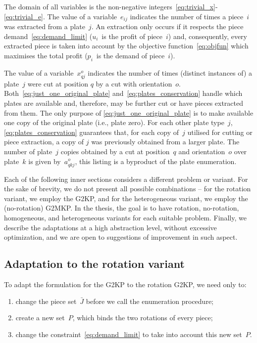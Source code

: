 \documentclass[ppgc,prop-tese,english,formais,babel]{iiufrgs}
\begin{document}
The domain of all variables is the non-negative integers~\eqref{eq:trivial_x}-\eqref{eq:trivial_e}.
The value of a variable~\(e_{ij}\) indicates the number of times a piece~\(i\) was extracted from a  plate~\(j\).
An extraction only occurs if it respects the piece demand~\eqref{eq:demand_limit} (\(u_i\)~is the profit of piece~\(i\)) and, consequently, every extracted piece is taken into account by the objective function~\eqref{eq:objfun} which maximises the total profit (\(p_i\)~is the demand of piece~\(i\)).

The value of a variable~\(x^o_{qj}\) indicates the number of times (distinct instances of) a plate~\(j\) were cut at position \(q\) by a cut with orientation~\(o\).
Both~\eqref{eq:just_one_original_plate} and~\eqref{eq:plates_conservation} handle which plates are available and, therefore, may be further cut or have pieces extracted from them.
The only purpose of \eqref{eq:just_one_original_plate} is to make available one copy of the original plate (i.e., plate zero).
For each other plate type~\(j\), \eqref{eq:plates_conservation} guarantees that, for each copy of~\(j\) utilised for cutting or piece extraction, a copy of \(j\) was previously obtained from a larger plate.
The number of plate~\(j\) copies obtained by a cut at position~\(q\) and orientation~\(o\) over plate~\(k\) is given by~\(a^o_{qkj}\), this listing is a byproduct of the plate enumeration.

Each of the following inner sections considers a different problem or variant.
For the sake of brevity, we do not present all possible combinations -- for the rotation variant, we employ the G2KP, and for the heterogeneous variant, we employ the (no-rotation) G2MKP.
In the thesis, the goal is to have rotation, no-rotation, homogeneous, and heterogeneous variants for each suitable problem.
Finally, we describe the adaptations at a high abstraction level, without excessive optimization, and we are open to suggestions of improvement in such aspect.

\subsection{Adaptation to the rotation variant}

To adapt the formulation for the G2KP to the rotation G2KP, we need only to:

\begin{enumerate}
\item change the piece set~\(\bar{J}\) before we call the enumeration procedure;\label{item:J_change}
\item create a new set~\(P\), which binds the two rotations of every piece;\label{item:P_creation}
\item change the constraint~\eqref{eq:demand_limit} to take into account this new set~\(P\).\label{item:demand_con_change}
\end{enumerate}
\end{document}
